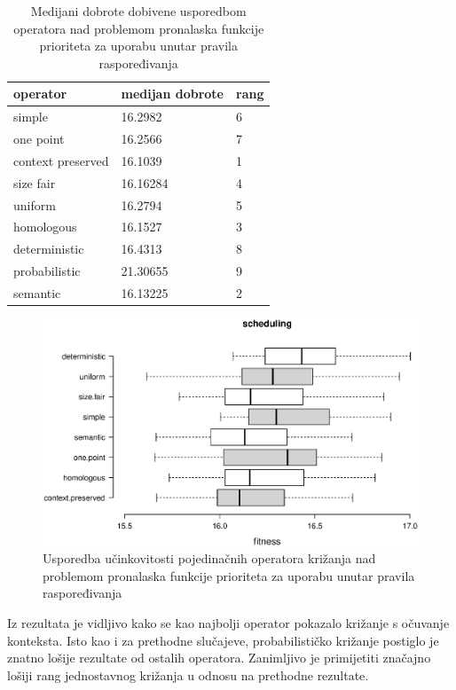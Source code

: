 \begin{table}[H]
 	\centering

    \caption{Medijani dobrote dobivene usporedbom operatora nad problemom pronalaska funkcije prioriteta za uporabu unutar pravila raspoređivanja}
    \begin{tabular}{| l | l | l |}
    \hline
    \textbf{operator} & \textbf{medijan dobrote} & \textbf{rang}\\ \hline
    simple & 16.2982 & 6\\ \hline
    one point & 16.2566 & 7\\ \hline
    context preserved & 16.1039 & 1\\ \hline
    size fair & 16.16284 & 4\\ \hline
    uniform & 16.2794 & 5\\ \hline
    homologous & 16.1527 & 3\\ \hline
    deterministic & 16.4313 & 8\\ \hline
    probabilistic & 21.30655 & 9\\ \hline
    semantic & 16.13225 & 2\\ \hline
    \end{tabular}
    
    \label{iprojekttable}
\end{table}

\begin{figure}[H]
	\centering
	\includegraphics[trim=0cm 4cm 0cm 1cm, scale=0.6]{./slike/boxPlots/iprojekt.eps}
	\caption{Usporedba učinkovitosti pojedinačnih operatora križanja nad problemom pronalaska funkcije prioriteta za uporabu unutar pravila raspoređivanja}
	\label{iprojektBox}
\end{figure}

Iz rezultata je vidljivo kako se kao najbolji operator pokazalo križanje s očuvanje konteksta. Isto kao i za prethodne slučajeve, probabilističko križanje postiglo je znatno lošije rezultate od ostalih operatora. Zanimljivo je primijetiti značajno lošiji rang jednostavnog križanja u odnosu na prethodne rezultate.

